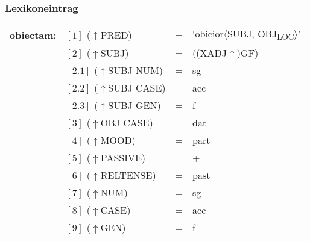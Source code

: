 \documentclass[12pt,a4paper]{article}
\begin{document}
\subsubsection{Lexikoneintrag}
\begin{singlespace}
\begin{tabular}{ l  l  l  l  } 
\textbf{obiectam}: & $[1]$ \:  ($\uparrow$PRED) & = & `obicior$\langle$SUBJ, OBJ\textsubscript{LOC}$\rangle$'\\
$\qquad$ & $[2]$ \:  ($\uparrow$SUBJ) & = & ((XADJ$\uparrow$)GF)\\
$\qquad$ & $[2.1]$ \:  ($\uparrow$SUBJ NUM) & = & sg \\
$\qquad$ & $[2.2]$ \: ($\uparrow$SUBJ CASE) & = & acc \\
$\qquad$ & $[2.3]$ \: ($\uparrow$SUBJ GEN) & = & f \\
$\qquad$ & $[3]$ \: ($\uparrow$OBJ CASE) & = & dat \\
$\qquad$ & $[4]$ \:  ($\uparrow$MOOD) & = & part\\
$\qquad$ & $[5]$ \:  ($\uparrow$PASSIVE) & = & + \\
$\qquad$ & $[6]$ \:  ($\uparrow$RELTENSE) & = & past \\
$\qquad$ & $[7]$ \:  ($\uparrow$NUM) & = & sg \\
$\qquad$ & $[8]$ \: ($\uparrow$CASE) & = & acc \\
$\qquad$ & $[9]$ \: ($\uparrow$GEN) & = & f \\
\end{tabular}
\newline
\newline
\end{singlespace}
\end{document}
